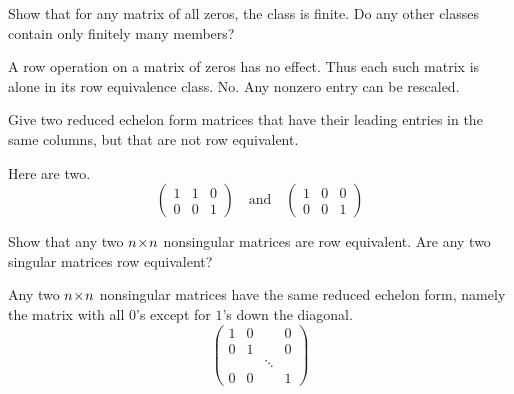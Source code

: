 \begin{exercises}
    \begin{exparts} 
      \partsitem Show that for any matrix of all zeros, the class is finite.
      \partsitem Do any other classes contain only finitely many members?
    \end{exparts}
    \begin{answer}
     \begin{exparts}
      \partsitem A row operation on a matrix of zeros has no effect.
        Thus each such matrix is alone in its row equivalence class.  
      \partsitem No.
        Any nonzero entry can be rescaled.
     \end{exparts}
    \end{answer}
  \recommended \item 
    Give two reduced echelon form matrices that have their leading
    entries in the same columns,
    but that are not row equivalent.
    \begin{answer}
      Here are two.
      \begin{equation*}
        \begin{pmatrix}
          1  &1  &0  \\
          0  &0  &1
        \end{pmatrix}
        \quad\text{and}\quad
        \begin{pmatrix}
          1  &0  &0  \\
          0  &0  &1
        \end{pmatrix}
      \end{equation*}  
     \end{answer}
  \recommended \item 
    Show that any two \( n \! \times \! n \) nonsingular matrices are
    row equivalent.
    Are any two singular matrices row equivalent?
    \begin{answer}
      Any two \( n \! \times \! n \) nonsingular matrices have
      the same reduced echelon
      form, namely the matrix with all \( 0 \)'s except for \( 1 \)'s down
      the diagonal.
      \begin{equation*}
        \begin{pmatrix}
          1  &0  &       &0  \\
          0  &1  &       &0  \\
             &   &\ddots &   \\
          0  &0  &       &1
        \end{pmatrix}
      \end{equation*}


\end{answer}
\end{exercises}
